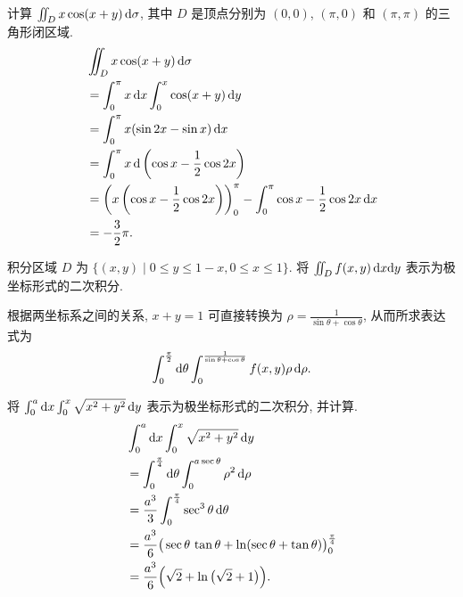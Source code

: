 \documentclass[a4paper,10pt,fleqn]{article}
\begin{document}
\begin{exmp}
    计算 $\iint_Dx\cos(x+y)\,{\rm d}\sigma$, 其中 $D$ 是顶点分别为 $(0,0)$, $(\pi,0)$ 和 $(\pi,\pi)$ 的三角形闭区域.
    \begin{align*}
         & \iint_Dx\cos(x+y)\,{\rm d}\sigma                                                                        \\
         & =\int_0^\pi x\,{\rm d}x\int_0^x\cos(x+y)\,{\rm d}y                                                      \\
         & =\int_0^\pi x(\sin 2x-\sin x)\,{\rm d}x                                                                 \\
         & = \int_0^\pi x\,{\rm d}\left(\cos x-\frac{1}{2}\cos2x\right)                                            \\
         & =\left(x\left(\cos x-\frac{1}{2}\cos2x\right)\right)_0^\pi-\int_0^\pi\cos x-\frac{1}{2}\cos2x\,{\rm d}x \\
         & =-\frac{3}{2}\pi.
    \end{align*}
\end{exmp}

\begin{exmp}
    积分区域 $D$ 为 $\big\{(x,y)\mid0\leq y\leq1-x,0\leq x\leq1\big\}$. 将 $\iint_Df(x,y)\,{\rm d}x{\rm d}y$
    表示为极坐标形式的二次积分.

    根据两坐标系之间的关系, $x+y=1$ 可直接转换为 $\rho=\frac{1}{\sin\theta+\cos\theta}$, 从而所求表达式为
    \[
        \int_0^{\frac{\pi}{2}}{\rm d}\theta\int_0^{\frac{1}{\sin\theta+\cos\theta}}f(x,y)\rho\,{\rm d}\rho.
    \]
\end{exmp}

\pagebreak

\begin{exmp}
    将 $\int_0^a{\rm d}x\int_0^x\sqrt{x^2+y^2}\,{\rm d}y$ 表示为极坐标形式的二次积分, 并计算.
    \begin{align*}
         & \int_0^a{\rm d}x\int_0^x\sqrt{x^2+y^2}\,{\rm d}y                                            \\
         & =\int_0^{\frac{\pi}{4}}{\rm d}\theta\int_0^{a\sec\theta}\rho^2\,{\rm d}\rho                 \\
         & =\frac{a^3}{3}\int_0^{\frac{\pi}{4}}\sec^3\theta\,{\rm d}\theta                             \\
         & =\frac{a^3}{6}\big(\sec\theta\,\tan\theta+\ln(\sec\theta+\tan\theta)\big)_0^{\frac{\pi}{4}} \\
         & =\frac{a^3}{6}\Big(\sqrt{2}+\ln\big(\sqrt{2}+1\big)\Big).
    \end{align*}
\end{exmp}
\end{document}
